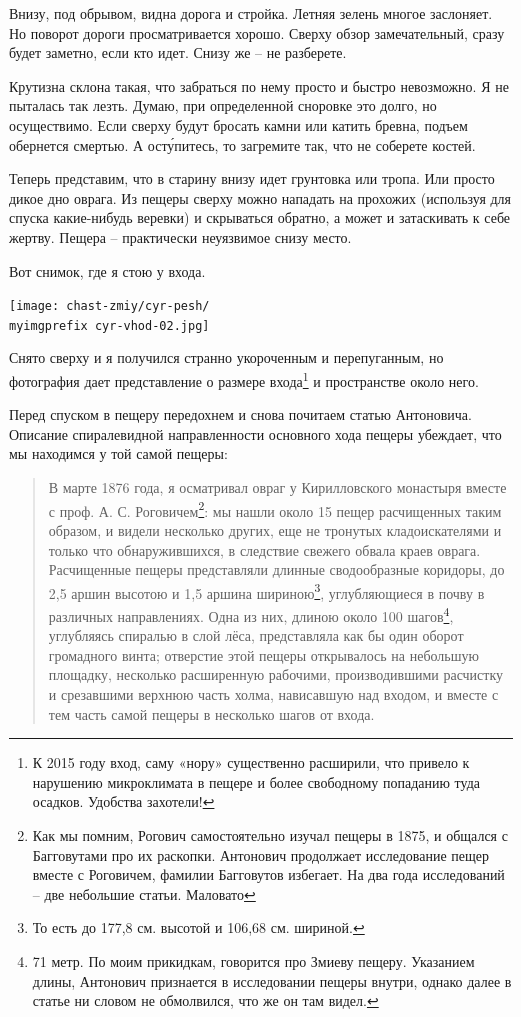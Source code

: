 Внизу, под обрывом, видна дорога и стройка. Летняя зелень многое заслоняет. Но поворот дороги просматривается хорошо. Сверху обзор замечательный, сразу будет заметно, если кто идет. Снизу же – не разберете.

Крутизна склона такая, что забраться по нему просто и быстро невозможно. Я не пыталась так лезть. Думаю, при определенной сноровке это долго, но осуществимо. Если сверху будут бросать камни или катить бревна, подъем обернется смертью. А ост\'упитесь, то загремите так, что не соберете костей.

Теперь представим, что в старину внизу идет грунтовка или тропа. Или просто дикое дно оврага. Из пещеры сверху можно нападать на прохожих (используя для спуска какие-нибудь веревки) и скрываться обратно, а может и затаскивать к себе жертву. Пещера – практически неуязвимое снизу место.

Вот снимок, где я стою у входа.

\begin{center}
\texttt{[image: chast-zmiy/cyr-pesh/\\myimgprefix cyr-vhod-02.jpg]}
\end{center}

Снято сверху и я получился странно укороченным и перепуганным, но фотография дает представление о размере входа\footnote{К 2015 году вход, саму «нору» существенно расширили, что привело к нарушению микроклимата в пещере и более свободному попаданию туда осадков. Удобства захотели!} и пространстве около него. 

Перед спуском в пещеру передохнем и снова почитаем статью Антоновича. Описание спиралевидной направленности основного хода пещеры убеждает, что мы находимся у той самой пещеры:

\begin{quotation}
В марте 1876 года, я осматривал овраг у Кирилловского монастыря вместе с проф. А. С. Роговичем\footnote{Как мы помним, Рогович самостоятельно изучал пещеры в 1875, и общался с Багговутами про их раскопки. Антонович продолжает исследование пещер вместе с Роговичем, фамилии Багговутов избегает. На два года исследований – две небольшие статьи. Маловато}: мы нашли около 15 пещер расчищенных таким образом, и видели несколько других, еще не тронутых кладоискателями и только что обнаружившихся, в следствие свежего обвала краев оврага. Расчищенные пещеры представляли длинные сводообразные коридоры, до 2,5 аршин высотою и 1,5 аршина шириною\footnote{То есть до 177,8 см. высотой и 106,68 см. шириной.}, углубляющиеся в почву в различных направлениях. Одна из них, длиною около 100 шагов\footnote{71 метр. По моим прикидкам, говорится про Змиеву пещеру. Указанием длины, Антонович признается в исследовании пещеры внутри, однако далее в статье ни словом не обмолвился, что же он там видел.}, углубляясь спиралью в слой лёса, представляла как бы один оборот громадного винта; отверстие этой пещеры открывалось на небольшую площадку, несколько расширенную рабочими, производившими расчистку и срезавшими верхнюю часть холма, нависавшую над входом, и вместе с тем часть самой пещеры в несколько шагов от входа.
\end{quotation}

